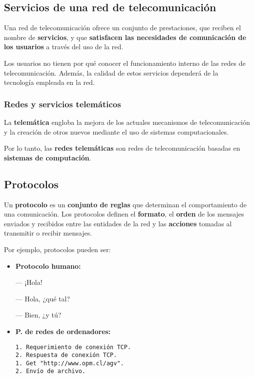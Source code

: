 \documentclass[a4paper]{book}
\numberwithin{figure}{chapter}
\numberwithin{equation}{subsection}
\newcommand{\circledNumber}[1]{\raisebox{.9pt}{\textcircled{\raisebox{-.9pt}{#1}}}}
\begin{document}
\subsection{Servicios de una red de telecomunicación}
Una red de telecomunicación ofrece un conjunto de prestaciones, que reciben el nombre de \textbf{servicios}, y que \textbf{satisfacen las necesidades de comunicación de los usuarios} a través del uso de la red.

Los usuarios no tienen por qué conocer el funcionamiento interno de las redes de telecomunicación. Además, la calidad de estos servicios dependerá de la tecnología empleada en la red.

\subsubsection{Redes y servicios telemáticos}
La \textbf{telemática} engloba la mejora de los actuales mecanismos de telecomunicación y la creación de otros nuevos mediante el uso de sistemas computacionales.

Por lo tanto, las \textbf{redes telemáticas} son redes de telecomunicación basadas en \textbf{sistemas de computación}.

\subsection{Protocolos}
Un \textbf{protocolo} es un \textbf{conjunto de reglas} que determinan el comportamiento de una comunicación. Los protocolos definen el \textbf{formato}, el \textbf{orden} de los mensajes enviados y recibidos entre las entidades de la red y las \textbf{acciones} tomadas al transmitir o recibir mensajes.

Por ejemplo, protocolos pueden ser:
\begin{multicols}{3}
  \begin{itemize}
    \item \textbf{Protocolo humano:}

          \circledNumber{1} --- ¡Hola!

          \circledNumber{2} --- Hola, ¿qué tal?

          \circledNumber{1} --- Bien, ¿y tú?
  \end{itemize}
  \columnbreak
  \begin{itemize}
    \item \textbf{P. de redes de ordenadores:}
          \begin{verbatim}
1. Requerimiento de conexión TCP.
2. Respuesta de conexión TCP.
1. Get "http://www.opm.cl/agv".
2. Envío de archivo.
\end{verbatim}
  \end{itemize}
  \columnbreak
\end{multicols}
\end{document}
